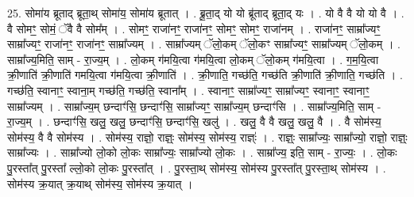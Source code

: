 \documentclass[17pt]{extarticle}
\begin{document}
25. सोमा॑य ब्रूताद् ब्रूता॒थ् सोमा॑य॒ सोमा॑य ब्रूतात् । . ब्रू॒ता॒द् यो यो ब्रू॑ताद् ब्रूता॒द् यः । . यो वै वै यो यो वै । . वै सोमꣳ॒॒ सोमं॒ ॅवै वै सोम᳚म् । . सोमꣳ॒॒ राजा॑नꣳ॒॒ राजा॑नꣳ॒॒ सोमꣳ॒॒ सोमꣳ॒॒ राजा॑नम् । . राजा॑नꣳ॒॒ साम्रा᳚ज्यꣳ॒॒ साम्रा᳚ज्यꣳ॒॒ राजा॑नꣳ॒॒ राजा॑नꣳ॒॒ साम्रा᳚ज्यम् । . साम्रा᳚ज्यम् ॅलो॒कम् ॅलो॒कꣳ साम्रा᳚ज्यꣳ॒॒ साम्रा᳚ज्यम् ॅलो॒कम् । . साम्रा᳚ज्य॒मिति॒ साम् - रा॒ज्य॒म् । . लो॒कम् ग॑मयि॒त्वा ग॑मयि॒त्वा लो॒कम् ॅलो॒कम् ग॑मयि॒त्वा । . ग॒म॒यि॒त्वा क्री॒णाति॑ क्री॒णाति॑ गमयि॒त्वा ग॑मयि॒त्वा क्री॒णाति॑ । . क्री॒णाति॒ गच्छ॑ति॒ गच्छ॑ति क्री॒णाति॑ क्री॒णाति॒ गच्छ॑ति । . गच्छ॑ति॒ स्वानाꣳ॒॒ स्वाना॒म् गच्छ॑ति॒ गच्छ॑ति॒ स्वाना᳚म् । . स्वानाꣳ॒॒ साम्रा᳚ज्यꣳ॒॒ साम्रा᳚ज्यꣳ॒॒ स्वानाꣳ॒॒ स्वानाꣳ॒॒ साम्रा᳚ज्यम् । . साम्रा᳚ज्य॒म् छन्दाꣳ॑सि॒ छन्दाꣳ॑सि॒ साम्रा᳚ज्यꣳ॒॒ साम्रा᳚ज्य॒म् छन्दाꣳ॑सि । . साम्रा᳚ज्य॒मिति॒ साम् - रा॒ज्य॒म् । . छन्दाꣳ॑सि॒ खलु॒ खलु॒ छन्दाꣳ॑सि॒ छन्दाꣳ॑सि॒ खलु॑ । . खलु॒ वै वै खलु॒ खलु॒ वै । . वै सोम॑स्य॒ सोम॑स्य॒ वै वै सोम॑स्य । . सोम॑स्य॒ राज्ञो॒ राज्ञ्ः॒ सोम॑स्य॒ सोम॑स्य॒ राज्ञ्ः॑ । . राज्ञ्ः॒ साम्रा᳚ज्यः॒ साम्रा᳚ज्यो॒ राज्ञो॒ राज्ञ्ः॒ साम्रा᳚ज्यः । . साम्रा᳚ज्यो लो॒को लो॒कः साम्रा᳚ज्यः॒ साम्रा᳚ज्यो लो॒कः । . साम्रा᳚ज्य॒ इति॒ साम् - रा॒ज्यः॒ । . लो॒कः पु॒रस्ता᳚त् पु॒रस्ता᳚ ल्लो॒को लो॒कः पु॒रस्ता᳚त् । . पु॒रस्ता॒थ् सोम॑स्य॒ सोम॑स्य पु॒रस्ता᳚त् पु॒रस्ता॒थ् सोम॑स्य । . सोम॑स्य क्र॒यात् क्र॒याथ् सोम॑स्य॒ सोम॑स्य क्र॒यात् । \newline
\end{document}
